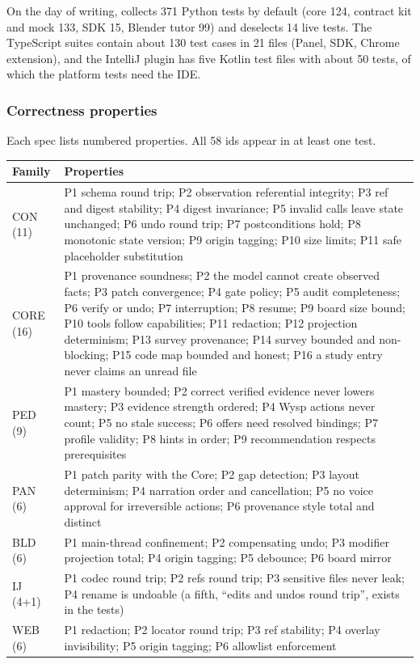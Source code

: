 On the day of writing,  collects 371 Python tests by default (core 124, contract kit and mock 133, SDK 15, Blender tutor 99) and deselects 14 live tests. The TypeScript suites contain about 130 test cases in 21 files (Panel, SDK, Chrome extension), and the IntelliJ plugin has five Kotlin test files with about 50 tests, of which the platform tests need the IDE.

\subsubsection{Correctness properties}

Each spec lists numbered properties. All 58 ids appear in at least one test.

\begin{xltabular}{\textwidth}{@{}L{1.2cm}Y@{}}
\toprule
\textbf{Family} & \textbf{Properties} \\
\midrule
CON (11) & P1 schema round trip; P2 observation referential integrity; P3 ref and digest stability; P4 digest invariance; P5 invalid calls leave state unchanged; P6 undo round trip; P7 postconditions hold; P8 monotonic state version; P9 origin tagging; P10 size limits; P11 safe placeholder substitution \\
CORE (16) & P1 provenance soundness; P2 the model cannot create observed facts; P3 patch convergence; P4 gate policy; P5 audit completeness; P6 verify or undo; P7 interruption; P8 resume; P9 board size bound; P10 tools follow capabilities; P11 redaction; P12 projection determinism; P13 survey provenance; P14 survey bounded and non-blocking; P15 code map bounded and honest; P16 a study entry never claims an unread file \\
PED (9) & P1 mastery bounded; P2 correct verified evidence never lowers mastery; P3 evidence strength ordered; P4 Wysp actions never count; P5 no stale success; P6 offers need resolved bindings; P7 profile validity; P8 hints in order; P9 recommendation respects prerequisites \\
PAN (6) & P1 patch parity with the Core; P2 gap detection; P3 layout determinism; P4 narration order and cancellation; P5 no voice approval for irreversible actions; P6 provenance style total and distinct \\
BLD (6) & P1 main-thread confinement; P2 compensating undo; P3 modifier projection total; P4 origin tagging; P5 debounce; P6 board mirror \\
IJ (4+1) & P1 codec round trip; P2 refs round trip; P3 sensitive files never leak; P4 rename is undoable (a fifth, ``edits and undos round trip'', exists in the tests) \\
WEB (6) & P1 redaction; P2 locator round trip; P3 ref stability; P4 overlay invisibility; P5 origin tagging; P6 allowlist enforcement \\
\bottomrule
\end{xltabular}

